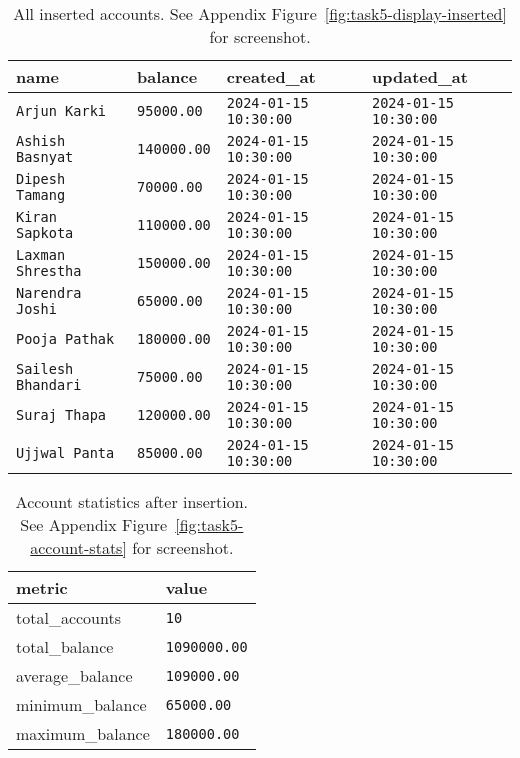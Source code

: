 \begin{table}[H]
  \centering
  \footnotesize
  \begin{tabular}{|l|l|l|l|}
    \hline
    \textbf{name} & \textbf{balance} & \textbf{created\_at} & \textbf{updated\_at} \\
    \hline
    \texttt{Arjun Karki} & \texttt{95000.00} & \texttt{2024-01-15 10:30:00} & \texttt{2024-01-15 10:30:00} \\
    \texttt{Ashish Basnyat} & \texttt{140000.00} & \texttt{2024-01-15 10:30:00} & \texttt{2024-01-15 10:30:00} \\
    \texttt{Dipesh Tamang} & \texttt{70000.00} & \texttt{2024-01-15 10:30:00} & \texttt{2024-01-15 10:30:00} \\
    \texttt{Kiran Sapkota} & \texttt{110000.00} & \texttt{2024-01-15 10:30:00} & \texttt{2024-01-15 10:30:00} \\
    \texttt{Laxman Shrestha} & \texttt{150000.00} & \texttt{2024-01-15 10:30:00} & \texttt{2024-01-15 10:30:00} \\
    \texttt{Narendra Joshi} & \texttt{65000.00} & \texttt{2024-01-15 10:30:00} & \texttt{2024-01-15 10:30:00} \\
    \texttt{Pooja Pathak} & \texttt{180000.00} & \texttt{2024-01-15 10:30:00} & \texttt{2024-01-15 10:30:00} \\
    \texttt{Sailesh Bhandari} & \texttt{75000.00} & \texttt{2024-01-15 10:30:00} & \texttt{2024-01-15 10:30:00} \\
    \texttt{Suraj Thapa} & \texttt{120000.00} & \texttt{2024-01-15 10:30:00} & \texttt{2024-01-15 10:30:00} \\
    \texttt{Ujjwal Panta} & \texttt{85000.00} & \texttt{2024-01-15 10:30:00} & \texttt{2024-01-15 10:30:00} \\
    \hline
  \end{tabular}
  \caption{All inserted accounts. See Appendix Figure~\ref{fig:task5-display-inserted} for screenshot.}
\end{table}

\begin{table}[H]
  \centering
  \begin{tabular}{|l|l|}
    \hline
    \textbf{metric} & \textbf{value} \\
    \hline
    total\_accounts & \texttt{10} \\
    total\_balance & \texttt{1090000.00} \\
    average\_balance & \texttt{109000.00} \\
    minimum\_balance & \texttt{65000.00} \\
    maximum\_balance & \texttt{180000.00} \\
    \hline
  \end{tabular}
  \caption{Account statistics after insertion. See Appendix Figure~\ref{fig:task5-account-stats} for screenshot.}
\end{table}

